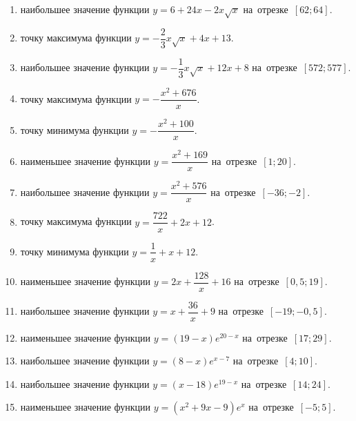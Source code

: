 \documentclass[a4paper,10pt]{article}
\begin{document}
\begin{enumerate}
\item {} наибольшее значение функции $y=6+24x -2x\sqrt{x}$ на~отрезке~$\left[62;64\right]$.

\item {} точку максимума функции $y=-\dfrac{2}{3}x\sqrt{x} +4x+13$.

\item {} наибольшее значение функции $y=-\dfrac{1}{3}x\sqrt{x} +12x+8$ на~отрезке~$\left[572;577\right]$.

\item {} точку максимума функции $y=-\dfrac{x^2 +676}{x}$.

\item {} точку минимума функции $y=-\dfrac{x^2 +100}{x}$.

\item {} наименьшее значение функции $y=\dfrac{x^2 +169}{x}$ на~отрезке~$\left[1;20\right]$.

\item {} наибольшее значение функции $y=\dfrac{x^2 +576}{x}$ на~отрезке~$\left[-36;-2\right]$.

\item {} точку максимума функции $y=\dfrac{722}{x} +2x+12$.

\item {} точку минимума функции $y=\dfrac{1}{x} +x+12$.

\item {} наименьшее значение функции $y=2x+\dfrac{128}{x} +16$ на~отрезке~$\left[0,5;19\right]$.

\item {} наибольшее значение функции $y=x+\dfrac{36}{x} +9$ на~отрезке~$\left[-19;-0,5\right]$.

\item {} наименьшее значение функции $y=\left(19-x\right)e^{20-x}$ на~отрезке~$\left[17;29\right]$.

\item {} наибольшее значение функции $y=\left(8-x\right)e^{x-7}$ на~отрезке~$\left[4;10\right]$.

\item {} наибольшее значение функции $y=\left(x-18\right)e^{19-x}$ на~отрезке~$\left[14;24\right]$.

\item {} наименьшее значение функции $y=\left(x^2 +9x -9\right)e^{x }$ на~отрезке~$\left[-5;5\right]$.


\end{enumerate}
\end{document}
